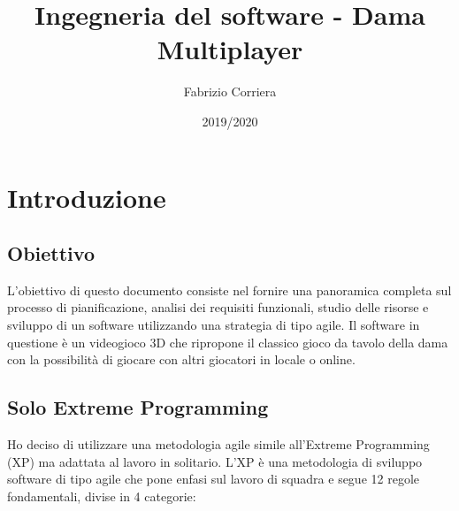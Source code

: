 \documentclass[12pt]{article}
\title{Ingegneria del software - Dama Multiplayer}
\author{Fabrizio Corriera}
\date{2019/2020}
\begin{document}
\maketitle
\thispagestyle{empty}
\newpage
{}
\tableofcontents
\newpage
{}

\section{Introduzione}

\subsection{Obiettivo}
L'obiettivo di questo documento consiste nel fornire una panoramica completa sul processo di pianificazione, analisi dei requisiti funzionali, studio delle risorse e sviluppo di un software utilizzando una strategia di tipo agile.
Il software in questione è un videogioco 3D che ripropone il classico gioco da tavolo della dama con la possibilità di giocare con altri giocatori in locale o online.

\subsection{Solo Extreme Programming}
Ho deciso di utilizzare una metodologia agile simile all'Extreme Programming (XP) ma adattata al lavoro in solitario.
L'XP è una metodologia di sviluppo software di tipo agile che pone enfasi sul lavoro di squadra e segue 12 regole fondamentali, divise in 4 categorie:
\end{document}
